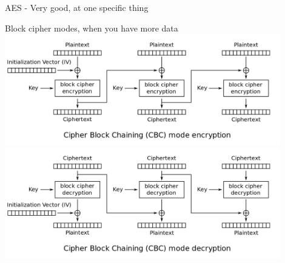 \documentclass[10pt, compress]{beamer}
\begin{document}
\begin{frame}{AES - Very good, at one specific thing}
\end{frame}
  
  
\begin{frame}{Block cipher modes, when you have more data}
  \includegraphics[width=0.9\textwidth]{images/1280px-CBC_encryption.svg.png} \\
  \includegraphics[width=0.9\textwidth]{images/1280px-CBC_decryption.svg.png} \\
\end{frame}
\end{document}
